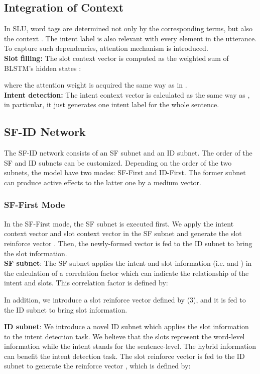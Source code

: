 \documentclass[11pt,a4paper]{article}
\begin{document}
\subsection{Integration of Context}
In SLU, word tags are determined not only by the corresponding terms, but also the context \cite{chen2016end}. The intent label is also relevant with every element in the utterance. To capture such dependencies, attention mechanism is introduced.\\
\textbf{Slot filling:} The  slot context vector  is computed as the weighted sum of BLSTM's hidden states :

where the attention weight  is acquired the same way as in \cite{liu2016attention}.\\
\textbf{Intent detection:} The intent context vector  is calculated as the same way as , in particular, it just generates one intent label for the whole sentence.
\subsection{SF-ID Network}
The SF-ID network consists of an SF subnet and an ID subnet. The order of the SF and ID subnets can be customized. Depending on the order of the two subnets, the model have two modes: SF-First and ID-First. The former subnet can produce active effects to the latter one by a medium vector.
\subsubsection{SF-First Mode}
In the SF-First mode, the SF subnet is executed first. We apply the intent context vector  and slot context vector  in the SF subnet and generate the slot reinforce vector . Then, the newly-formed vector  is fed to the ID subnet to bring the slot information.\\
\textbf{SF subnet}: The SF subnet applies the intent and slot information (i.e.  and ) in the calculation of a correlation factor  which can indicate the relationship of the intent and slots. This correlation factor  is defined by:

In addition, we introduce a slot reinforce vector  defined by (3), and it is fed to the ID subnet to bring slot information.

\textbf{ID subnet}: We introduce a novel ID subnet which applies the slot information to the intent detection task. We believe that the slots represent the word-level information while the intent stands for the sentence-level. The hybrid information can benefit the intent detection task. The slot reinforce vector  is fed to the ID subnet to generate the reinforce vector , which is defined by:
\end{document}
